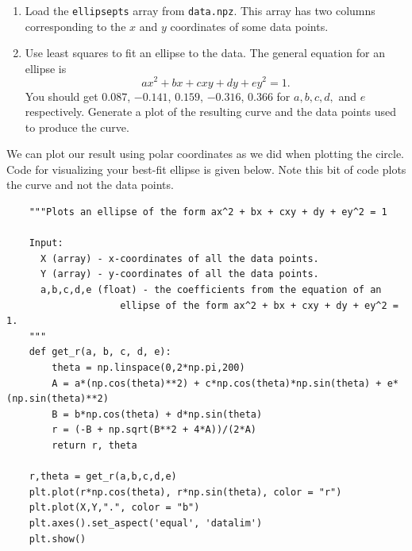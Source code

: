\begin{problem}
\leavevmode
\begin{enumerate}
\item Load the \texttt{ellipsepts} array from \texttt{data.npz}. This array has two columns corresponding to the $x$ and $y$ coordinates of some data points.
\item Use least squares to fit an ellipse to the data.
The general equation for an ellipse is
\[
ax^2 + bx + cxy + dy + ey^2 = 1.
\]
You should get  $0.087$, $-0.141$,  $0.159$, $-0.316$, $0.366$ for $a, b, c, d,$ and $e$ respectively. Generate a plot of the resulting curve and the data points used to produce the curve.
\end{enumerate}

We can plot our result using polar coordinates as we did when plotting the circle. Code for visualizing your best-fit ellipse is given below. Note this bit of code plots the curve and not the data points.

\begin{lstlisting}
    """Plots an ellipse of the form ax^2 + bx + cxy + dy + ey^2 = 1

    Input:
      X (array) - x-coordinates of all the data points.
      Y (array) - y-coordinates of all the data points.
      a,b,c,d,e (float) - the coefficients from the equation of an
                    ellipse of the form ax^2 + bx + cxy + dy + ey^2 = 1.
    """
    def get_r(a, b, c, d, e):
        theta = np.linspace(0,2*np.pi,200)
        A = a*(np.cos(theta)**2) + c*np.cos(theta)*np.sin(theta) + e*(np.sin(theta)**2)
        B = b*np.cos(theta) + d*np.sin(theta)
        r = (-B + np.sqrt(B**2 + 4*A))/(2*A)
        return r, theta

    r,theta = get_r(a,b,c,d,e)
    plt.plot(r*np.cos(theta), r*np.sin(theta), color = "r")
    plt.plot(X,Y,".", color = "b")
    plt.axes().set_aspect('equal', 'datalim')
    plt.show()
\end{lstlisting}

\end{problem}

